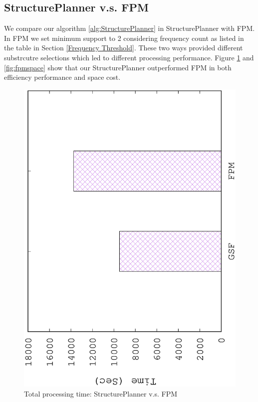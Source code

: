 \subsection{StructurePlanner v.s. FPM}
We compare our algorithm \ref{alg:StructurePlanner} in StructurePlanner with FPM. In FPM we set minimum support to 2 considering frequency count as listed in the table in Section \ref{Frequency Threshold}. These two ways provided different substrcutre selections which led to different processing performance. Figure \ref{fig:fpm} and \ref{fig:fpmspace} show that our StructurePlanner outperformed FPM in both efficiency performance and space cost.

\begin{figure}[H]
\centering
\includegraphics[scale=0.5, angle=270]{plot/fpm}
\caption{Total processing time: StructurePlanner v.s. FPM}
\label{fig:fpm}
\end{figure}


